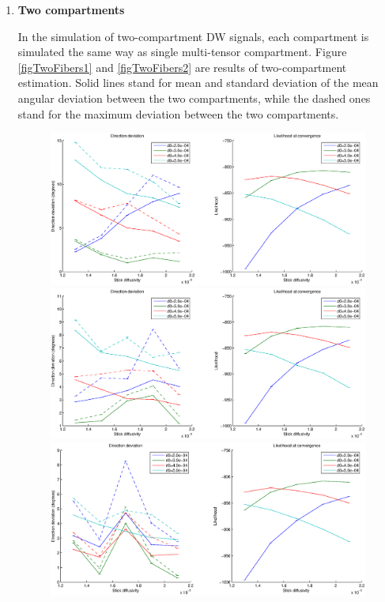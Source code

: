 \documentclass{article}
\begin{document}
\begin{enumerate}
\item \textbf{Two compartments}

In the simulation of two-compartment DW signals, each compartment is simulated the same way as single multi-tensor compartment. Figure \ref{figTwoFibers1} and \ref{figTwoFibers2} are results of two-compartment estimation. Solid lines stand for mean and standard deviation of the mean angular deviation between the two compartments, while the dashed ones stand for the maximum deviation between the two compartments.

\begin{figure}[H]
    \centering
    \includegraphics[width=\textwidth]{figures/two_fiber__snr=20__angle=30.eps}
    \includegraphics[width=\textwidth]{figures/two_fiber__snr=20__angle=45.eps}
    \includegraphics[width=\textwidth]{figures/two_fiber__snr=20__angle=60.eps}

\end{figure}
\end{enumerate}
\end{document}
